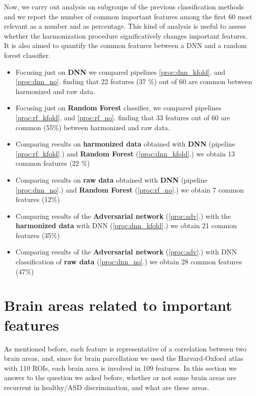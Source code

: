 \documentclass[11pt]{report}
\begin{document}
Now, we carry out analysis on subgroups of the previous classification methods and we report the number of common important features among the first 60 most relevant as a number and as percentage.
This kind of analysis is useful to assess whether the harmonization procedure significatively changes important features.
It is also aimed to quantify the common features between a DNN and a random forest classifier.

\begin{itemize}
\item Focusing just on \textbf{DNN} we compared pipelines \ref{proc:dnn_kfold}. and \ref{proc:dnn_no}. finding that 22 features (37 \%) out of 60 are common between harmonized and raw data.

\item Focusing just on \textbf{Random Forest} classifier, we compared pipelines \ref{proc:rf_kfold}. and \ref{proc:rf_no}. finding that 33 features out of 60 are common (55\%) between harmonized and raw data.

\item Comparing results on  \textbf{harmonized data} obtained with \textbf{DNN} (pipeline \ref{proc:rf_kfold}.) and \textbf{Random Forest} (\ref{proc:dnn_kfold}.) we obtain 13 common features (22 \%)

\item Comparing results on \textbf{raw data} obtained with \textbf{DNN} (pipeline \ref{proc:dnn_no}.) and \textbf{Random Forest} (\ref{proc:rf_no}.) we obtain 7 common features  (12\%)

\item Comparing results of the \textbf{Adversarial network} (\ref{proc:adv}.) with the \textbf{harmonized data} with DNN (\ref{proc:dnn_kfold}.) we obtain 21 common features (35\%)

\item Comparing results of the \textbf{Adversarial network} (\ref{proc:adv}.) with DNN classification of \textbf{raw data} (\ref{proc:dnn_no}.) we obtain 28 common features (47\%)
\end{itemize}



\section{Brain areas related to important features} \hfill

As mentioned before, each feature is representative of a correlation between two brain areas, and, since for brain parcellation we used the Harvard-Oxford atlas with 110 ROIs, each brain area is involved in 109 features.
In this section we answer to the question we asked before, whether or not some brain areas are recurrent in healthy/ASD discrimination, and what are these areas.
\end{document}
